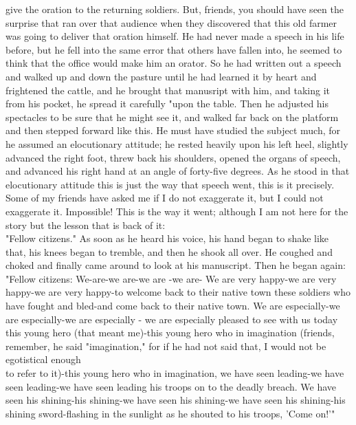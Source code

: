 \documentclass[10pt]{article}
\begin{document}
give the oration to the returning soldiers. But, friends, you should have seen the surprise that ran over that audience when they discovered that this old farmer was going to deliver that oration himself. He had never made a speech in his life before, but he fell into the same error that others have fallen into, he seemed to think that the office would make him an orator. So he had written out a speech and walked up and down the pasture until he had learned it by heart and frightened the cattle, and he brought that manusript with him, and taking it from his pocket, he spread it carefully "upon the table. Then he adjusted his spectacles to be sure that he might see it, and walked far back on the platform and then stepped forward like this. He must have studied the subject much, for he assumed an elocutionary attitude; he rested heavily upon his left heel, slightly advanced the right foot, threw back his shoulders, opened the organs of speech, and advanced his right hand at an angle of forty-five degrees. As he stood in that elocutionary attitude this is just the way that speech went, this is it precisely. Some of my friends have asked me if I do not exaggerate it, but I could not exaggerate it. Impossible! This is the way it went; although I am not here for the story but the lesson that is back of it:\\
"Fellow citizens." As soon as he heard his voice, his hand began to shake like that, his knees began to tremble, and then he shook all over. He coughed and choked and finally came around to look at his manuscript. Then he began again: "Fellow citizens: We-are-we are-we are -we are- We are very happy-we are very happy-we are very happy-to welcome back to their native town these soldiers who have fought and bled-and come back to their native town. We are especially-we are especially-we are especially - we are especially pleased to see with us today this young hero (that meant me)-this young hero who in imagination (friends, remember, he said "imagination," for if he had not said that, I would not be egotistical enough\\
to refer to it)-this young hero who in imagination, we have seen leading-we have seen leading-we have seen leading his troops on to the deadly breach. We have seen his shining-his shining-we have seen his shining-we have seen his shining-his shining sword-flashing in the sunlight as he shouted to his troops, 'Come on!'"
\end{document}
